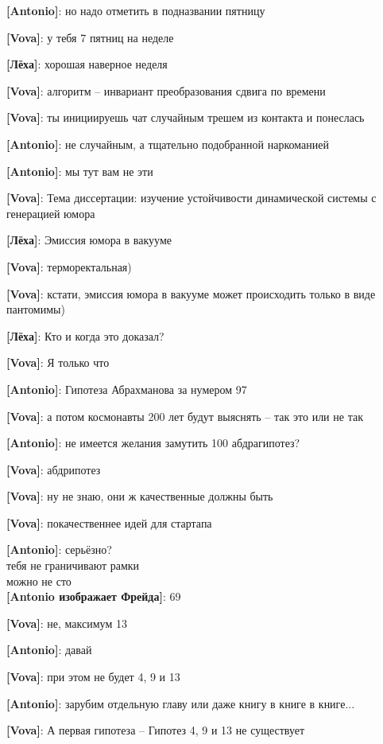 \begin{flushleft}
\textbf{[Antonio]}: но надо отметить в подназвании пятницу

\textbf{[Vova]}: у тебя 7 пятниц на неделе

\textbf{[Лёха]}: хорошая наверное неделя

\textbf{[Vova]}: алгоритм -- инвариант преобразования сдвига по времени

\textbf{[Vova]}: ты инициируешь чат случайным трешем из контакта и понеслась

\textbf{[Antonio]}: не случайным, а тщательно подобранной наркоманией

\textbf{[Antonio]}: мы тут вам не эти

\textbf{[Vova]}: Тема диссертации: изучение устойчивости динамической системы с генерацией юмора

\textbf{[Лёха]}: Эмиссия юмора в вакууме

\textbf{[Vova]}: терморектальная)

\textbf{[Vova]}: кстати, эмиссия юмора в вакууме может происходить только в виде пантомимы)

\textbf{[Лёха]}: Кто и когда это доказал?

\textbf{[Vova]}: Я только что

\textbf{[Antonio]}: Гипотеза Абрахманова за нумером 97

\textbf{[Vova]}: а потом космонавты 200 лет будут выяснять -- так это или не так

\textbf{[Antonio]}: не имеется желания замутить 100 абдрагипотез?

\textbf{[Vova]}: абдрипотез

\textbf{[Vova]}: ну не знаю, они ж качественные должны быть

\textbf{[Vova]}: покачественнее идей для стартапа

\textbf{[Antonio]}: серьёзно?\\
тебя не граничивают рамки\\
можно не сто\\

\textbf{[Antonio изображает Фрейда]}: 69

\textbf{[Vova]}: не, максимум 13

\textbf{[Antonio]}: давай

\textbf{[Vova]}: при этом не будет 4, 9 и 13

\textbf{[Antonio]}: зарубим отдельную главу
или даже книгу в книге в книге...

\textbf{[Vova]}: А первая гипотеза -- Гипотез 4, 9 и 13 не существует


\end{flushleft}
